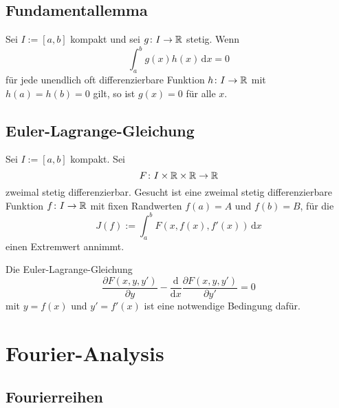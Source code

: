 \subsection{Fundamentallemma}

Sei $I:=[a,b]$ kompakt und sei $g\colon I\to\mathbb R$
stetig. Wenn 
\begin{equation}
\int_a^b g(x)h(x)\,\mathrm dx=0
\end{equation}
für jede unendlich oft differenzierbare Funktion $h\colon I\to\mathbb R$
mit $h(a)=h(b)=0$ gilt, so ist $g(x)=0$ für alle $x$.

\subsection{Euler-Lagrange-Gleichung}

Sei $I:=[a,b]$ kompakt. Sei
\begin{equation}
F\colon I\times\mathbb R\times\mathbb R\to\mathbb R
\end{equation}
zweimal stetig differenzierbar. Gesucht ist eine zweimal
stetig differenzierbare Funktion $f\colon I\to\mathbb R$ mit fixen
Randwerten $f(a)=A$ und $f(b)=B$, für die
\begin{equation}
J(f) := \int_a^b F(x,f(x),f'(x))\,\mathrm dx
\end{equation}
einen Extremwert annimmt.

Die Euler-Lagrange-Gleichung
\begin{equation}
\frac{\partial F(x,y,y')}{\partial y}
-\frac{\mathrm d}{\mathrm dx}\frac{\partial F(x,y,y')}{\partial y'}
=0
\end{equation}
mit $y=f(x)$ und $y'=f'(x)$ ist eine notwendige Bedingung dafür.

\clearpage
\section{Fourier-Analysis}
\subsection{Fourierreihen}
